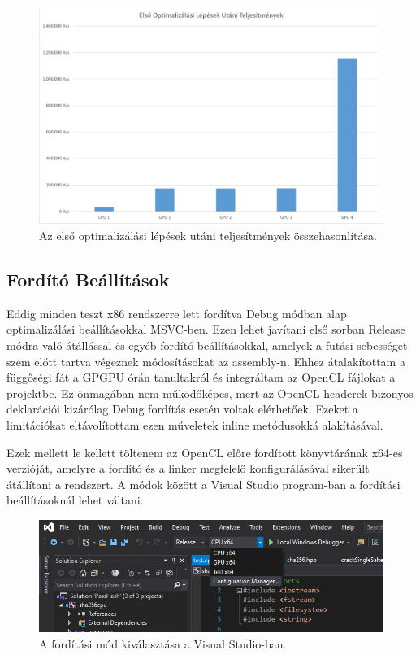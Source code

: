 \begin{figure}[H]
    \centering
    \includegraphics[width=\textwidth]{images/charts/performance-1-optimization.png}
    \caption{Az első optimalizálási lépések utáni teljesítmények összehasonlítása.}
\end{figure}





\subsection{Fordító Beállítások}

Eddig minden teszt x86 rendszerre lett fordítva Debug módban alap optimalizálási beállításokkal MSVC-ben. Ezen lehet javítani első sorban Release módra való átállással és egyéb fordító beállításokkal, amelyek a futási sebességet szem előtt tartva végeznek módosításokat az assembly-n. Ehhez átalakítottam a függőségi fát a GPGPU órán tanultakról és integráltam az OpenCL fájlokat a projektbe. Ez önmagában nem működőképes, mert az OpenCL headerek bizonyos deklarációi kizárólag Debug fordítás esetén voltak elérhetőek. Ezeket a limitációkat eltávolítottam ezen műveletek inline metódusokká alakításával.

Ezek mellett le kellett töltenem az OpenCL előre fordított könyvtárának x64-es verzióját, amelyre a fordító és a linker megfelelő konfigurálásával sikerült átállítani a rendszert. A módok között a Visual Studio program-ban a fordítási beállításoknál lehet váltani.

\begin{figure}[H]
    \centering
    \includegraphics[width=\textwidth]{images/illustrations/visualstudio-compile-modes.png}
    \caption{A fordítási mód kiválasztása a Visual Studio-ban.}
\end{figure}


